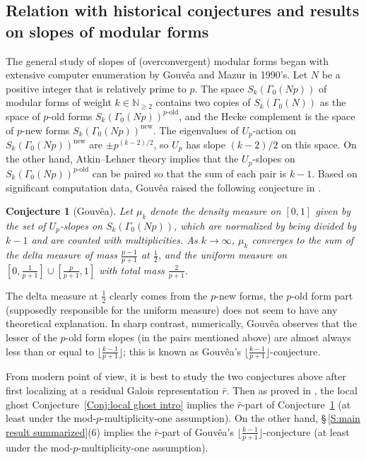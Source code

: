 \documentclass[12pt]{amsart}
\newtheorem{conjecture}[subsection]{Conjecture}
\theoremstyle{definition}
\numberwithin{equation}{subsection}
\def\NN{\mathbb{N}}
\newcommand{\new}{\mathrm{new}}
\newcommand{\old}{\textrm{-}\mathrm{old}}
\begin{document}
\subsection{Relation with historical conjectures and results on slopes of modular forms}

The general study of slopes of (overconvergent) modular forms began with extensive computer enumeration by Gouv\^ea and Mazur \cite{gouvea-mazur, gouvea} in 1990's.
Let $N$ be a positive integer that is relatively prime to $p$.
The space $S_k(\Gamma_0(Np))$ of modular forms of weight $k \in \NN_{\geq 2}$ contains two copies of $S_k(\Gamma_0(N))$ as the space of $p$-old forms $S_k(\Gamma_0(Np))^{p\old}$, and the Hecke complement is the space of $p$-new forms $S_k(\Gamma_0(Np))^{\new}$. The eigenvalues of $U_p$-action on $S_k(\Gamma_0(Np))^{\new}$ are $\pm p^{(k-2)/2}$, so $U_p$ has slope $(k-2)/2$ on this space. On the other hand, Atkin--Lehner theory implies that the $U_p$-slopes on $S_k(\Gamma_0(Np))^{p\old}$ can be paired so that the sum of each pair is $k-1$.
Based on significant computation data, 
Gouv\^ea raised the following conjecture in \cite{gouvea}.

\begin{conjecture}
[Gouv\^ea]
\label{Conj:Gouvea} Let $\mu_k$ denote the density measure on $[0,1]$ given by the set of $U_p$-slopes on $S_k(\Gamma_0(Np))$, which are normalized by being divided by $k-1$ and are counted with multiplicities.
As $k \to \infty$, $\mu_k$ converges to the sum of the delta measure of mass $\frac{p-1}{p+1}$ at $\frac 12$, and the uniform measure on $[0, \frac 1{p+1}] \cup [\frac p{p+1}, 1]$ with total mass $\frac 2{p+1}$.
\end{conjecture}
The delta measure at $\frac 12$ clearly comes from the $p$-new forms, the $p$-old form part (supposedly responsible for the uniform measure) does not seem to have any theoretical explanation. In sharp contrast, numerically, 
Gouv\^ea observes that the lesser of the $p$-old form slopes (in the pairs mentioned above) are almost always less than or equal to $\big\lfloor\frac{k-1}{p+1}\big\rfloor$; this is known as Gouv\^ea's $\big\lfloor\frac{k-1}{p+1}\big\rfloor$-conjecture.

From modern point of view, it is best to study the two conjectures above after first localizing at a residual Galois representation $\bar r$.  Then as proved in \cite{bergdall-pollack3}, the local ghost Conjecture~\ref{Conj:local ghost intro} implies the $\bar r$-part of Conjecture~\ref{Conj:Gouvea} (at least under the mod-$p$-multiplicity-one assumption). On the other hand, \S\,\ref{S:main result summarized}(6) implies the $\bar r$-part of  Gouv\^ea's $\big\lfloor\frac{k-1}{p+1}\big\rfloor$-conjecture (at least under the mod-$p$-multiplicity-one assumption).
\end{document}
